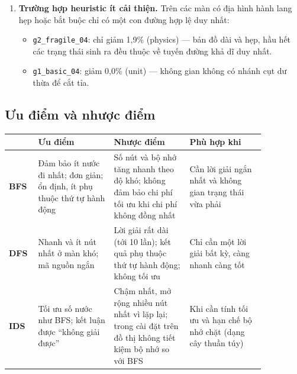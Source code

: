 \begin{enumerate}
\begin{itemize}
\item \texttt{g4\_\allowbreak{}combined\_\allowbreak{}01}: giảm tới \textbf{80,3\%} (physics) / \textbf{76,9\%} (unit) — heuristic cắt tỉa gần như toàn bộ các nhánh đi chệch hướng khỏi mục tiêu.
\item \texttt{g3\_\allowbreak{}switch\_\allowbreak{}02}: giảm \textbf{26,9\%} (physics) / \textbf{42,4\%} (unit) — heuristic dẫn hướng hiệu quả qua các cây cầu và công tắc.
\end{itemize}
\item \textbf{Trường hợp heuristic ít cải thiện.} Trên các màn có địa hình hành lang hẹp hoặc bắt buộc chỉ có một con đường hợp lệ duy nhất:
\begin{itemize}
\item \texttt{g2\_\allowbreak{}fragile\_\allowbreak{}04}: chỉ giảm 1,9\% (physics) — bản đồ dài và hẹp, hầu hết các trạng thái sinh ra đều thuộc về tuyến đường khả dĩ duy nhất.
\item \texttt{g1\_\allowbreak{}basic\_\allowbreak{}04}: giảm 0,0\% (unit) — không gian không có nhánh cụt dư thừa để cắt tỉa.
\end{itemize}
\end{enumerate}

\subsection{Ưu điểm và nhược điểm}

{\renewcommand{\arraystretch}{1.25}
\begin{longtable}{|>{\raggedright\arraybackslash}p{0.070\linewidth}|>{\raggedright\arraybackslash}p{0.263\linewidth}|>{\raggedright\arraybackslash}p{0.263\linewidth}|>{\raggedright\arraybackslash}p{0.263\linewidth}|}
\hline
 & \textbf{Ưu điểm} & \textbf{Nhược điểm} & \textbf{Phù hợp khi} \\ \hline
\endhead
\hline
\endlastfoot
\textbf{BFS} & Đảm bảo ít nước đi nhất; đơn giản; ổn định, ít phụ thuộc thứ tự hành động & Số nút và bộ nhớ tăng nhanh theo độ khó; không đảm bảo chi phí tối ưu khi chi phí không đồng nhất & Cần lời giải ngắn nhất và không gian trạng thái vừa phải \\ \hline
\textbf{DFS} & Nhanh và ít nút nhất ở màn khó; mã nguồn ngắn & Lời giải rất dài (tới 10 lần); kết quả phụ thuộc thứ tự hành động; không tối ưu & Chỉ cần một lời giải bất kỳ, càng nhanh càng tốt \\ \hline
\textbf{IDS} & Tối ưu số nước như BFS; kết luận được ``không giải được'' & Chậm nhất, mở rộng nhiều nút nhất vì lặp lại; trong cài đặt trên đồ thị không tiết kiệm bộ nhớ so với BFS & Khi cần tính tối ưu và hạn chế bộ nhớ chặt (dạng cây thuần túy) \\
\end{longtable}
}

